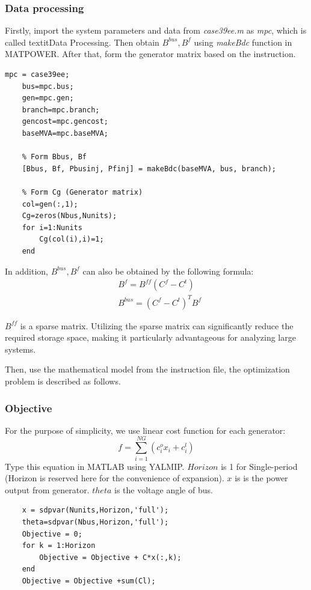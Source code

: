 \documentclass[lettersize,journal]{IEEEtran}
\begin{document}
\subsubsection{Data processing}
Firstly, import the system parameters and data from \textit{case39ee.m} as \textit{mpc}, which is called textit{Data Processing}. Then obtain $B^{bus}, B^f$ using \textit{makeBdc} function in MATPOWER. After that, form the generator matrix based on the instruction.

\begin{lstlisting}[]
	mpc = case39ee;
	bus=mpc.bus;
	gen=mpc.gen;
	branch=mpc.branch;
	gencost=mpc.gencost;
	baseMVA=mpc.baseMVA;
	
	% Form Bbus, Bf
	[Bbus, Bf, Pbusinj, Pfinj] = makeBdc(baseMVA, bus, branch);
	
	% Form Cg (Generator matrix)
	col=gen(:,1);
	Cg=zeros(Nbus,Nunits);
	for i=1:Nunits
		Cg(col(i),i)=1;
	end
\end{lstlisting}

In addition, $B^{bus}, B^f$ can also be obtained by the following formula:
\begin{align}
	&B^f = B^{ff}(C^f-C^t)\\
	&B^{bus} = (C^f-C^t)^TB^f
\end{align}

$B^{ff}$ is a sparse matrix. Utilizing the sparse matrix can significantly reduce the required storage space, making it particularly advantageous for analyzing large systems.

Then, use the mathematical model from the instruction file, the optimization problem is described as follows.

\subsubsection{Objective}

For the purpose of simplicity, we use linear cost function for each generator:
\begin{equation}
	f=\sum_{i=1}^{NG}(c_i^ox_i+c_i^l)
\end{equation}
Type this equation in MATLAB using YALMIP. $Horizon$ is 1 for Single-period (Horizon is reserved here for the convenience of expansion). $x$ is is the power output from generator. $theta$ is the voltage angle of bus.
\begin{lstlisting}[]
%% OPF Model
	x = sdpvar(Nunits,Horizon,'full');
	theta=sdpvar(Nbus,Horizon,'full');
	Objective = 0;
	for k = 1:Horizon
		Objective = Objective + C*x(:,k);
	end
	Objective = Objective +sum(Cl);
\end{lstlisting}
\end{document}
